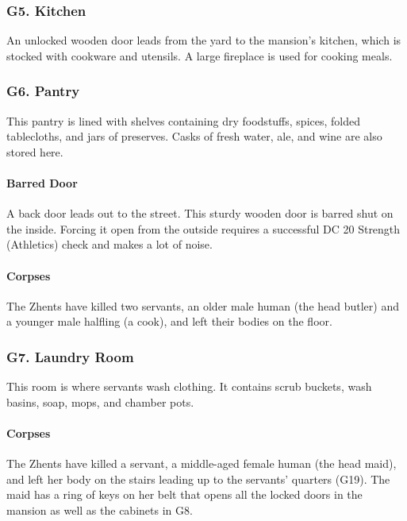 \documentclass[10pt,a4paper,twoside,twocolumn,openany,nodeprecatedcode]{dndbook}
\begin{document}
\subsubsection{G5. Kitchen}
An unlocked wooden door leads from the yard to the mansion's kitchen, which is stocked with cookware and utensils. A large fireplace is used for cooking meals.
\subsubsection{G6. Pantry}
This pantry is lined with shelves containing dry foodstuffs, spices, folded tablecloths, and jars of preserves. Casks of fresh water, ale, and wine are also stored here.
\paragraph{Barred Door}
A back door leads out to the street. This sturdy wooden door is barred shut on the inside. Forcing it open from the outside requires a successful DC 20 Strength (Athletics) check and makes a lot of noise.
\paragraph{Corpses}
The Zhents have killed two servants, an older male human (the head butler) and a younger male halfling (a cook), and left their bodies on the floor.
\subsubsection{G7. Laundry Room}
This room is where servants wash clothing. It contains scrub buckets, wash basins, soap, mops, and chamber pots.
\paragraph{Corpses}
The Zhents have killed a servant, a middle-aged female human (the head maid), and left her body on the stairs leading up to the servants' quarters (G19). The maid has a ring of keys on her belt that opens all the locked doors in the mansion as well as the cabinets in G8.
\end{document}
